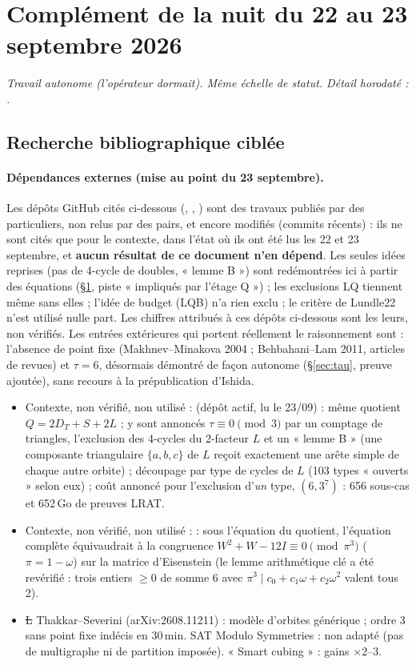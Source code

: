 \section{Complément de la nuit du 22 au 23 septembre 2026}\label{sec:nuit}
\emph{Travail autonome (l'opérateur dormait). Même échelle de statut. Détail horodaté : .}

\subsection{Recherche bibliographique ciblée}
\paragraph{Dépendances externes (mise au point du 23 septembre).} Les dépôts GitHub cités ci-dessous (, ,
) sont des travaux publiés par des particuliers, non relus par des pairs, et encore modifiés (commits récents) : ils ne sont
cités que pour le contexte, dans l'état où ils ont été lus les 22 et 23 septembre, et \textbf{aucun résultat de ce document n'en dépend}.
Les seules idées reprises (pas de 4-cycle de doubles, « lemme B ») sont redémontrées ici à partir des équations (§\ref{sec:nuit}, piste
« impliqués par l'étage Q ») ; les exclusions LQ tiennent même sans elles ; l'idée de budget (LQB) n'a rien exclu ; le critère de Lundle22
n'est utilisé nulle part. Les chiffres attribués à ces dépôts ci-dessous sont les leurs, non vérifiés. Les entrées extérieures qui portent
réellement le raisonnement sont : l'absence de point fixe (Makhnev--Minakova 2004 ; Behbahani--Lam 2011, articles de revues) et $\tau=6$,
désormais démontré de façon autonome (§\ref{sec:tau}, preuve ajoutée), sans recours à la prépublication d'Ishida.
\begin{itemize}[nosep]
\item Contexte, non vérifié, non utilisé :  (dépôt actif, lu le 23/09) : même quotient $Q=2D_T+S+2L$ ;
y sont annoncés $\tau\equiv0\pmod3$ par un comptage de triangles, l'exclusion des 4-cycles du 2-facteur $L$ et un « lemme B » (une composante
triangulaire $\{a,b,c\}$ de $L$ reçoit exactement une arête simple de chaque autre orbite) ; découpage par type de cycles de $L$ (103 types
« ouverts » selon eux) ; coût annoncé pour l'exclusion d'\emph{un} type, $(6,3^7)$ : 656 sous-cas et 652\,Go de preuves LRAT.
\item Contexte, non vérifié, non utilisé :  : sous l'équation du quotient, l'équation complète équivaudrait
à la congruence $W^2+W-12I\equiv0\pmod{\pi^3}$ ($\pi=1-\omega$) sur la matrice d'Eisenstein (le lemme arithmétique clé a été revérifié : trois
entiers $\ge0$ de somme 6 avec $\pi^3\mid c_0+c_1\omega+c_2\omega^2$ valent tous 2).
\item \st{L} Thakkar--Severini (arXiv:2608.11211) : modèle d'orbites générique ; ordre 3 sans point fixe indécis en 30\,min. SAT Modulo Symmetries :
non adapté (pas de multigraphe ni de partition imposée). « Smart cubing » : gains $\times2$--$3$.
\end{itemize}


